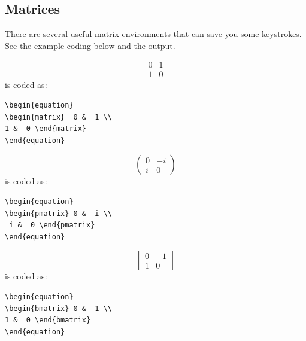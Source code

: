 \documentclass[lettersize,journal]{IEEEtran}
\begin{document}
\subsection{Matrices}
There are several useful matrix environments that can save you some keystrokes. See the example coding below and the output.

\begin{equation}
\begin{matrix}  0 &  1 \\ 
1 &  0 \end{matrix}
\end{equation}
is coded as:
\begin{verbatim}
\begin{equation}
\begin{matrix}  0 &  1 \\ 
1 &  0 \end{matrix}
\end{equation}
\end{verbatim}

\begin{equation}
\begin{pmatrix} 0 & -i \\
 i &  0 \end{pmatrix}
\end{equation}
is coded as:
\begin{verbatim}
\begin{equation}
\begin{pmatrix} 0 & -i \\
 i &  0 \end{pmatrix}
\end{equation}
\end{verbatim}

\begin{equation}
\begin{bmatrix} 0 & -1 \\ 
1 &  0 \end{bmatrix}
\end{equation}
is coded as:
\begin{verbatim}
\begin{equation}
\begin{bmatrix} 0 & -1 \\ 
1 &  0 \end{bmatrix}
\end{equation}
\end{verbatim}
\end{document}
